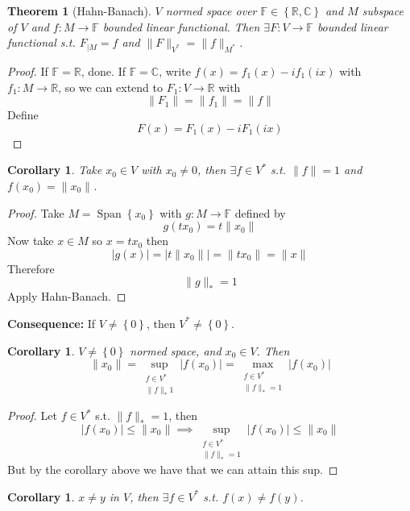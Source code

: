 \documentclass[11pt,a4paper]{article}
\theoremstyle{definition}
\theoremstyle{plain}
\newtheorem{theorem}[definition]{Theorem}
\newtheorem{corollary}[definition]{Corollary}
\theoremstyle{remark}
\newcommand{\F}{\mathbb{F}}
\newcommand{\R}{\mathbb{R}}
\newcommand{\C}{\mathbb{C}}
\renewcommand{\set}[1]{\left\{ #1 \right\}}
\newcommand{\abs}[1]{\lvert #1 \rvert}
\newcommand{\norm}[1]{\lVert #1 \rVert}
\newcommand{\1}{\mathbbm{1}}
\newcommand{\Span}{\operatorname{Span}}
\begin{document}
\begin{theorem}[Hahn-Banach] 
    $V$ normed space over $\F \in \set{\R, \C}$ and $M$ subspace of $V$ and $f \colon M \to \F$ bounded linear functional. Then $\exists F \colon V \to \F$ bounded linear functional 
    s.t. $F_{|M} = f$ and $\norm{F}_{V^*} = \norm{f}_{M^*}$.
\end{theorem}

\begin{proof}
    If $\F = \R$, done. If $\F = \C$, write $f(x) = f_1(x) - if_1(ix)$ with $f_1 \colon M \to \R$, so we can extend to $F_1 \colon V \to \R$ with 
    $$\norm{F_1} = \norm{f_1} =\norm{f}$$
    Define 
    $$F(x) = F_1(x) - iF_1(ix)$$ 
\end{proof}

\begin{corollary}
    Take $x_0 \in V$ with $x_0 \ne 0$, then $\exists f \in V^*$ s.t. $\norm{f} = 1$ and $f (x_0) = \norm{x_0}$.
\end{corollary}

\begin{proof}
    Take $M = \Span \set{x_0}$ with $g \colon M \to \F$ defined by 
    $$g(tx_0) = t \norm{x_0}$$
    Now take $x \in M$ so $x = tx_0$ then 
    $$\abs{g(x)} = \abs{t \norm{x_0}} = \norm{tx_0} = \norm{x}$$
    Therefore 
    $$\norm{g}_* = 1$$
    Apply Hahn-Banach.
\end{proof}

\textbf{Consequence:} If $V \ne \set{0}$, then $V^* \ne \set{0}$. 

\begin{corollary}
    $V \ne \set{0}$ normed space, and $x_0 \in V$. Then 
    $$\norm{x_0} = \sup_{\substack{f \in V^* \\ \norm{f}_* 1}} \abs{f(x_0)} = \max_{\substack{f \in V^* \\ \norm{f}_* = 1}} \abs{f(x_0)}$$
\end{corollary}

\begin{proof}
    Let $f \in V^*$ s.t. $\norm{f}_* = 1$, then 
    $$\abs{f(x_0)} \le \norm{x_0} \implies \sup_{\substack{f \in V^* \\ \norm{f}_* = 1}} \abs{f(x_0)} \le \norm{x_0}$$
    But by the corollary above we have that we can attain this sup. 
\end{proof}

\begin{corollary}
    $x \ne y$ in $V$, then $\exists f \in V^*$ s.t. $f(x) \ne f(y)$.
\end{corollary}
\end{document}
